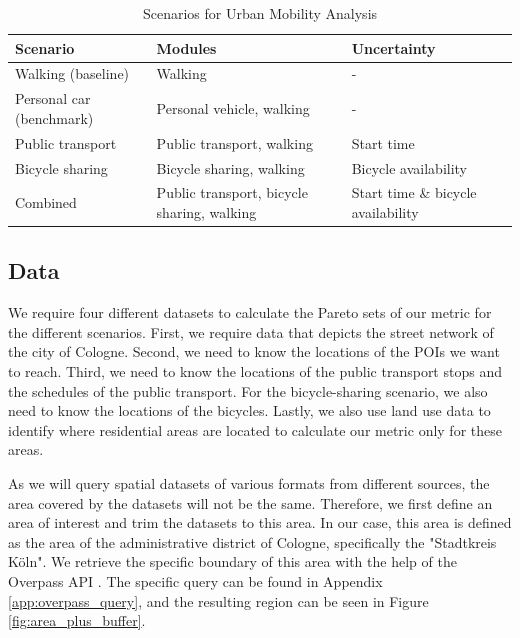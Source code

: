 \begin{table}[h]
\centering
\caption{Scenarios for Urban Mobility Analysis}
\label{table:scenarios}
\begin{tabular}{|p{4cm}|p{5cm}|p{4cm}|}
\hline
\textbf{Scenario} & \textbf{Modules} & \textbf{Uncertainty} \\
\hline
Walking (baseline) & Walking & - \\
\hline
Personal car (benchmark) & Personal vehicle, walking & - \\
\hline
Public transport & Public transport, walking & Start time \\
\hline
Bicycle sharing & Bicycle sharing, walking & Bicycle availability \\
\hline
Combined & Public transport, bicycle sharing, walking & Start time \& bicycle availability \\
\hline
\end{tabular}
\end{table}


\subsection{Data}
\label{subs:data}

We require four different datasets to calculate the Pareto sets of our metric for the different scenarios.
First, we require data that depicts the street network of the city of Cologne.
Second, we need to know the locations of the POIs we want to reach.
Third, we need to know the locations of the public transport stops and the schedules of the public transport.
For the bicycle-sharing scenario, we also need to know the locations of the bicycles.
Lastly, we also use land use data to identify where residential areas are located to calculate our metric only for these areas.

As we will query spatial datasets of various formats from different sources, the area covered by the datasets will not be the same.
Therefore, we first define an area of interest and trim the datasets to this area.
In our case, this area is defined as the area of the administrative district of Cologne, specifically the "Stadtkreis Köln".
We retrieve the specific boundary of this area with the help of the Overpass API .
The specific query can be found in Appendix \ref{app:overpass_query}, and the resulting region can be seen in Figure \ref{fig:area_plus_buffer}.

